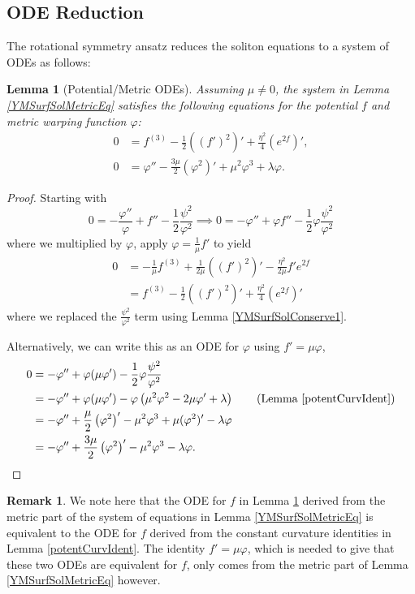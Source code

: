 \documentclass[12pt, a4paper, reqno, oneside]{amsart}
\renewcommand{\phi}{\varphi}
\numberwithin{equation}{section}
\theoremstyle{plain}
\newtheorem{lemma}[theorem]{Lemma}
\theoremstyle{definition}
\newtheorem{remark}[theorem]{Remark}
\theoremstyle{plain}
\begin{document}
\subsection{ODE Reduction}
The rotational symmetry ansatz reduces the soliton equations to a system of ODEs as follows:
\begin{lemma}[Potential/Metric ODEs]\label{poten_metric_ODE}
  Assuming $\mu\ne 0$, the system in Lemma \ref{YMSurfSolMetricEq} satisfies the following equations for the potential $f$ and metric warping function $\phi$:
  \begin{align*}
    0 &=f^{(3)}-\frac{1}{2}\left((f')^{2}\right)'+\frac{\eta^{2}}{4}\left(e^{2f}\right)',\\
    0 &=\phi''-\frac{3\mu}{2}\left(\phi^{2}\right)'+\mu^{2}\phi^{3}+\lambda\phi.
  \end{align*}
\end{lemma}
\begin{proof}
  Starting with
  \[
    0 = -\frac{\phi''}{\phi}+f''-\frac{1}{2}\frac{\psi^{2}}{\phi^{2}}\implies 0 = -\phi''+\phi f''-\frac{1}{2}\phi\frac{\psi^{2}}{\phi^{2}}
  \]
  where we multiplied by $\phi$, apply $\phi = \frac{1}{\mu}f'$ to yield
  \begin{align*}
    0 &= -\frac{1}{\mu}f^{(3)}+\frac{1}{2\mu}\left((f')^{2}\right)'-\frac{\eta^{2}}{2\mu}f'e^{2f}\\
      &=f^{(3)}-\frac{1}{2}\left((f')^{2}\right)'+\frac{\eta^{2}}{4}\left(e^{2f}\right)'
  \end{align*}
  where we replaced the $\frac{\psi^{2}}{\phi^{2}}$ term using Lemma \ref{YMSurfSolConserve1}.

  Alternatively, we can write this as an ODE for $\phi$ using $f'=\mu\phi$,
  \begin{align*}
    0 &= -\phi''+\phi (\mu\phi')-\frac{1}{2}\phi\frac{\psi^{2}}{\phi^{2}}\\
      &= -\phi''+\phi (\mu\phi')-\phi \left(\mu^{2}\phi^{2}-2\mu\phi'+\lambda\right) \tag*{(Lemma \ref{potentCurvIdent})}\\
      &= -\phi''+\frac{\mu}{2}\left(\phi^{2}\right)'-\mu^{2}\phi^{3}+\mu(\phi^{2})'-\lambda\phi \\
      &= -\phi''+\frac{3\mu}{2}\left(\phi^{2}\right)'-\mu^{2}\phi^{3}-\lambda\phi.
  \end{align*}
\end{proof}

\begin{remark}
  We note here that the ODE for $f$ in Lemma \ref{poten_metric_ODE} derived from the metric part of the system of equations in Lemma \ref{YMSurfSolMetricEq} is equivalent to the ODE for $f$ derived from the constant curvature identities in Lemma \ref{potentCurvIdent}. The identity $f'=\mu\varphi$, which is needed to give that these two ODEs are equivalent for $f$, only comes from the metric part of Lemma \ref{YMSurfSolMetricEq} however. 
\end{remark}
\end{document}
